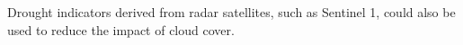 \documentclass[review]{elsarticle}
\begin{document}
 Drought indicators derived from radar satellites, such as Sentinel 1, could also be used to  reduce the impact of cloud cover.
 
 



 
 
 


\end{document}
